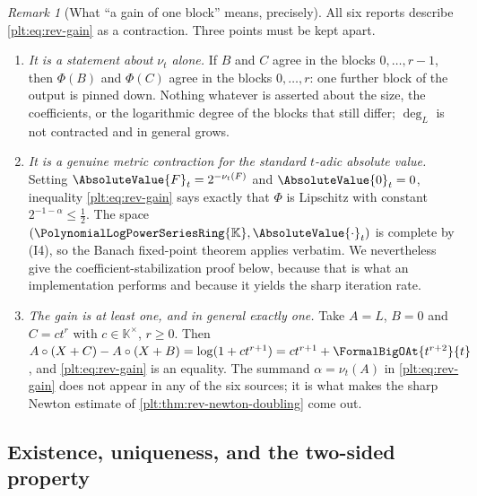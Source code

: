 \documentclass[11pt,oneside]{article}
\theoremstyle{plain}
\theoremstyle{definition}
\theoremstyle{remark}
\newtheorem{remark}[theorem]{Remark}
\newcommand{\K}{\mathbb{K}}
\newcommand{\PLpow}{\PolynomialLogPowerSeriesRing{\K}}   %
\newcommand{\ordt}{\nu_{t}}                              %
\newcommand{\compose}{\mathbin{\circ}}
\begin{document}
\begin{remark}[What ``a gain of one block'' means, precisely]
\label{plt:rmk:rev-gain-meaning}
All six reports describe \eqref{plt:eq:rev-gain} as a contraction.  Three
points must be kept apart.

\begin{enumerate}
\item \emph{It is a statement about \(\ordt\) alone.}  If \(B\) and \(C\) agree
in the blocks \(0,\dots,r-1\), then \(\Phi(B)\) and \(\Phi(C)\) agree in the
blocks \(0,\dots,r\): one further block of the output is pinned down.  Nothing
whatever is asserted about the size, the coefficients, or the logarithmic
degree of the blocks that still differ; \(\deg_L\) is not contracted and in
general grows.
\item \emph{It is a genuine metric contraction for the standard \(t\)-adic
absolute value.}  Setting \(\AbsoluteValue{F}_t=2^{-\ordt(F)}\) and
\(\AbsoluteValue{0}_t=0\), inequality \eqref{plt:eq:rev-gain} says exactly that
\(\Phi\) is Lipschitz with constant \(2^{-1-\alpha}\le\tfrac12\).  The space
\((\PLpow,\AbsoluteValue{\cdot}_t)\) is complete by (I4), so the Banach
fixed-point theorem applies verbatim.  We nevertheless give the
coefficient-stabilization proof below, because that is what an implementation
performs and because it yields the sharp iteration rate.
\item \emph{The gain is at least one, and in general exactly one.}  Take
\(A=L\), \(B=0\) and \(C=ct^r\) with \(c\in\K^\times\), \(r\ge0\).  Then
\(A\compose(X+C)-A\compose(X+B)=\log(1+ct^{r+1})
=ct^{r+1}+\FormalBigOAt{t^{r+2}}{t}\), and \eqref{plt:eq:rev-gain} is an
equality.  The summand \(\alpha=\ordt(A)\) in \eqref{plt:eq:rev-gain} does not
appear in any of the six sources; it is what makes the sharp Newton estimate of
\cref{plt:thm:rev-newton-doubling} come out.
\end{enumerate}
\end{remark}

\subsection{Existence, uniqueness, and the two-sided property}
\label{plt:sec:rev-existence}
\end{document}
